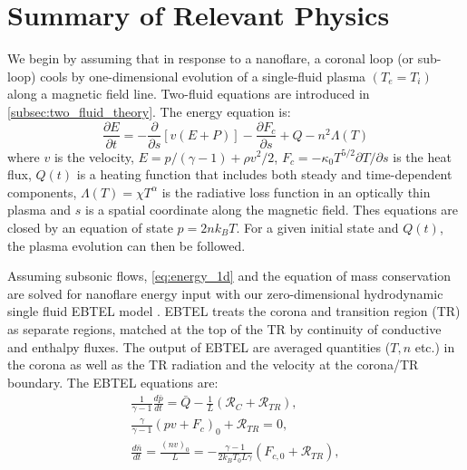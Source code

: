 \documentclass[apj]{emulateapj}
\begin{document}
	\section{Summary of Relevant Physics}
	\label{sec:phys_sum}
	\par We begin by assuming that in response to a nanoflare, a coronal loop (or sub-loop) cools by one-dimensional evolution of a single-fluid plasma $(T_e = T_i)$ along a magnetic field line. Two-fluid equations are introduced in \autoref{subsec:two_fluid_theory}. The energy equation is:
	\begin{equation}
		\label{eq:energy_1d}
		\frac{\partial E}{\partial t} = -\frac{\partial}{\partial s}[v(E+P)] - \frac{\partial F_c}{\partial s} + Q - n^2\Lambda(T)
	\end{equation}
	where $v$ is the velocity, $E=p/(\gamma -1) + \rho v^2/2$, $F_c=-\kappa_0 T^{5/2}\partial T/\partial s$ is the heat flux, $Q(t)$ is a heating function that includes both steady and time-dependent components, $\Lambda(T)=\chi T^{\alpha}$ is the radiative loss function in an optically thin plasma \citep[e.g.][]{klimchuk_highly_2008} and $s$ is a spatial coordinate along the magnetic field. Thes equations are closed by an equation of state $p=2nk_BT$. For a given initial state and $Q(t)$, the plasma evolution can then be followed. 
	\par Assuming subsonic flows, \autoref{eq:energy_1d} and the equation of mass conservation are solved for nanoflare energy input with our zero-dimensional hydrodynamic single fluid EBTEL model \citep[see][for derivations]{klimchuk_highly_2008,cargill_enthalpy-based_2012,cargill_enthalpy-based_2012-1,cargill_modelling_2015}. EBTEL treats the corona and transition region (TR) as separate regions, matched at the top of the TR by continuity of conductive and enthalpy fluxes. The output of EBTEL are averaged quantities ($T,n$ etc.) in the corona as well as the TR radiation and the velocity at the corona/TR boundary. The EBTEL equations are:
	\begin{align}
		\frac{1}{\gamma - 1}\frac{d\bar{p}}{dt} = \bar{Q} - \frac{1}{L}(\mathcal{R}_C + \mathcal{R}_{TR}), \label{eq:energy_0d} \\
		\frac{\gamma}{\gamma - 1}(pv + F_c)_0 + \mathcal{R}_{TR} = 0, \label{eq:tr_energy_0d} \\
		\frac{d\bar{n}}{dt} = \frac{(nv)_0}{L} = -\frac{\gamma - 1}{2k_BT_0L\gamma}(F_{c,0} + \mathcal{R}_{TR}),\label{eq:mass_0d}
	\end{align}
\end{document}
